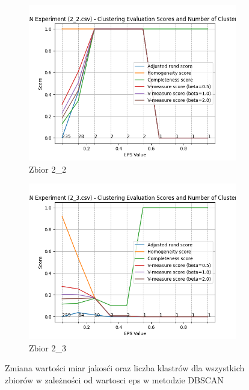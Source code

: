 \documentclass[12pt]{article}
\begin{document}
\begin{figure}[H]
\begin{subfigure}[b]{0.3\textwidth}
        \includegraphics[width=\linewidth]{img/exp_2/dbscan/2_2_scores.png}
        \caption{Zbior 2\_2}
    \end{subfigure}
    \hfill
    \begin{subfigure}[b]{0.3\textwidth}
        \includegraphics[width=\linewidth]{img/exp_2/dbscan/2_3_scores.png}
        \caption{Zbior 2\_3}
    \end{subfigure}
    \caption{\centering Zmiana wartości miar jakosći oraz liczba klastrów dla wszystkich zbiorów w zależności od wartosci eps w metodzie DBSCAN}
\end{figure}
\end{document}
